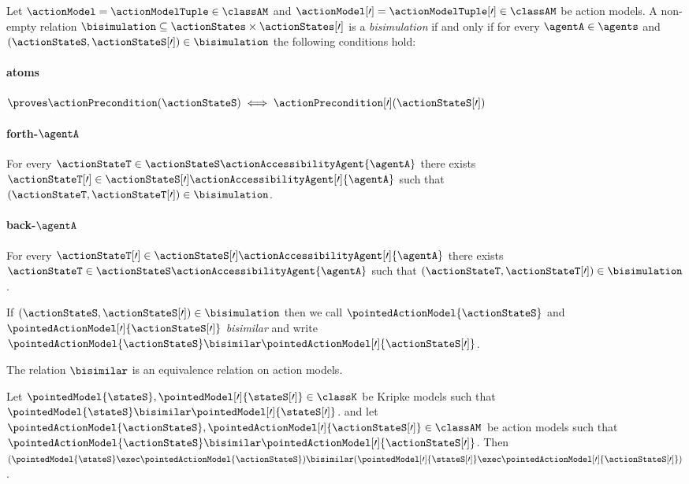 \documentclass[twoside]{aiml14}
\begin{document}
  \begin{definition}
      Let $\actionModel = \actionModelTuple \in \classAM$ 
      and $\actionModel[\prime] = \actionModelTuple[\prime] \in \classAM$
      be action models. 
      A non-empty relation $\bisimulation \subseteq \actionStates \times \actionStates[\prime]$
      is a {\em bisimulation} if and only if for every $\agentA \in \agents$ 
      and $(\actionStateS, \actionStateS[\prime]) \in \bisimulation$ the following conditions hold:

      \paragraph{atoms}
      $\proves \actionPrecondition(\actionStateS) \iff \actionPrecondition[\prime](\actionStateS[\prime])$

      \paragraph{forth-$\agentA$}
      For every $\actionStateT \in \actionStateS \actionAccessibilityAgent{\agentA}$ 
      there exists $\actionStateT[\prime] \in \actionStateS[\prime] \actionAccessibilityAgent[\prime]{\agentA}$
      such that $(\actionStateT, \actionStateT[\prime]) \in \bisimulation$.

      \paragraph{back-$\agentA$}
      For every $\actionStateT[\prime] \in \actionStateS[\prime] \actionAccessibilityAgent[\prime]{\agentA}$
      there exists $\actionStateT \in \actionStateS \actionAccessibilityAgent{\agentA}$ 
      such that $(\actionStateT, \actionStateT[\prime]) \in \bisimulation$.

      If $(\actionStateS, \actionStateS[\prime]) \in \bisimulation$ then we call
      $\pointedActionModel{\actionStateS}$ and $\pointedActionModel[\prime]{\actionStateS[\prime]}$
      {\em bisimilar} and write 
      $\pointedActionModel{\actionStateS} \bisimilar \pointedActionModel[\prime]{\actionStateS[\prime]}$.
  \end{definition}

  \begin{proposition}
      The relation $\bisimilar$ is an equivalence relation on action models.
  \end{proposition}

  \begin{proposition}
      Let $\pointedModel{\stateS}, \pointedModel[\prime]{\stateS[\prime]} \in \classK$ be Kripke models such that
      $\pointedModel{\stateS} \bisimilar \pointedModel[\prime]{\stateS[\prime]}$. 
      and let $\pointedActionModel{\actionStateS}, \pointedActionModel[\prime]{\actionStateS[\prime]} \in \classAM$ be action models such that
      $\pointedActionModel{\actionStateS} \bisimilar \pointedActionModel[\prime]{\actionStateS[\prime]}$.
      Then
      $(\pointedModel{\stateS} \exec \pointedActionModel{\actionStateS}) \bisimilar (\pointedModel[\prime]{\stateS[\prime]} \exec \pointedActionModel[\prime]{\actionStateS[\prime]})$.
  \end{proposition}
\end{document}
